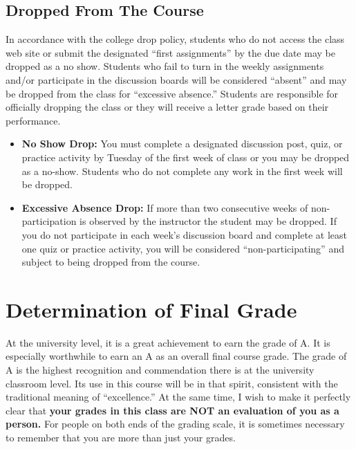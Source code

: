 \documentclass[11pt,]{article}
\begin{document}
\hypertarget{dropped-from-the-course}{%
\subsection{Dropped From The Course}\label{dropped-from-the-course}}

In accordance with the college drop policy, students who do not access
the class web site or submit the designated ``first assignments'' by the
due date may be dropped as a no show. Students who fail to turn in the
weekly assignments and/or participate in the discussion boards will be
considered ``absent'' and may be dropped from the class for ``excessive
absence.'' Students are responsible for officially dropping the class or
they will receive a letter grade based on their performance.

\begin{itemize}
\item
  \textbf{No Show Drop:} You must complete a designated discussion post,
  quiz, or practice activity by Tuesday of the first week of class or
  you may be dropped as a no-show. Students who do not complete any work
  in the first week will be dropped.
\item
  \textbf{Excessive Absence Drop:} If more than two consecutive weeks of
  non-participation is observed by the instructor the student may be
  dropped. If you do not participate in each week's discussion board and
  complete at least one quiz or practice activity, you will be
  considered ``non-participating'' and subject to being dropped from the
  course.
\end{itemize}

\hypertarget{determination-of-final-grade}{%
\section{Determination of Final
Grade}\label{determination-of-final-grade}}

At the university level, it is a great achievement to earn the grade of
A. It is especially worthwhile to earn an A as an overall final course
grade. The grade of A is the highest recognition and commendation there
is at the university classroom level. Its use in this course will be in
that spirit, consistent with the traditional meaning of ``excellence.''
At the same time, I wish to make it perfectly clear that \textbf{your
grades in this class are NOT an evaluation of you as a person.} For
people on both ends of the grading scale, it is sometimes necessary to
remember that you are more than just your grades.
\end{document}
